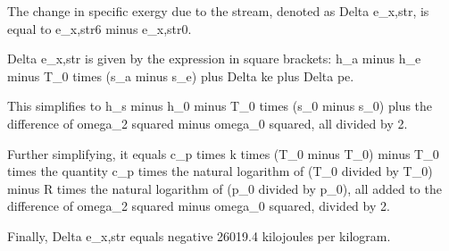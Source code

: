 The change in specific exergy due to the stream, denoted as Delta e_x,str, is equal to e_x,str6 minus e_x,str0.

Delta e_x,str is given by the expression in square brackets: h_a minus h_e minus T_0 times (s_a minus s_e) plus Delta ke plus Delta pe.

This simplifies to h_s minus h_0 minus T_0 times (s_0 minus s_0) plus the difference of omega_2 squared minus omega_0 squared, all divided by 2.

Further simplifying, it equals c_p times k times (T_0 minus T_0) minus T_0 times the quantity c_p times the natural logarithm of (T_0 divided by T_0) minus R times the natural logarithm of (p_0 divided by p_0), all added to the difference of omega_2 squared minus omega_0 squared, divided by 2.

Finally, Delta e_x,str equals negative 26019.4 kilojoules per kilogram.